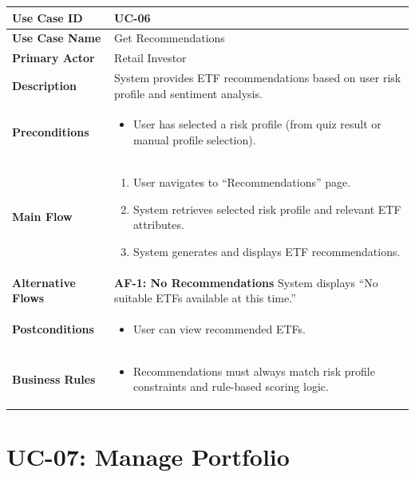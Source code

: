 \begin{longtable}{|>{\raggedright\arraybackslash\bfseries}p{3.5cm}|p{11cm}|}
\hline
\rowcolor{gray!15} Use Case ID & UC-06 \\ \hline
Use Case Name & Get Recommendations \\ \hline
Primary Actor & Retail Investor \\ \hline
Description & System provides ETF recommendations based on user risk profile and sentiment analysis. \\ \hline
Preconditions &
\begin{itemize}[leftmargin=*, nosep]
    \item User has selected a risk profile (from quiz result or manual profile selection).
\end{itemize} \\ \hline
Main Flow &
\begin{enumerate}[leftmargin=*, nosep]
    \item User navigates to “Recommendations” page.
    \item System retrieves selected risk profile and relevant ETF attributes.
    \item System generates and displays ETF recommendations.
\end{enumerate} \\ \hline
Alternative Flows &
\textbf{AF-1: No Recommendations} \newline
System displays “No suitable ETFs available at this time.” \\ \hline
Postconditions &
\begin{itemize}[leftmargin=*, nosep]
    \item User can view recommended ETFs.
\end{itemize} \\ \hline
Business Rules &
\begin{itemize}[leftmargin=*, nosep]
    \item Recommendations must always match risk profile constraints and rule-based scoring logic.
\end{itemize} \\ \hline
\end{longtable}

\section{UC-07: Manage Portfolio}
\label{uc:manage-portfolio}

